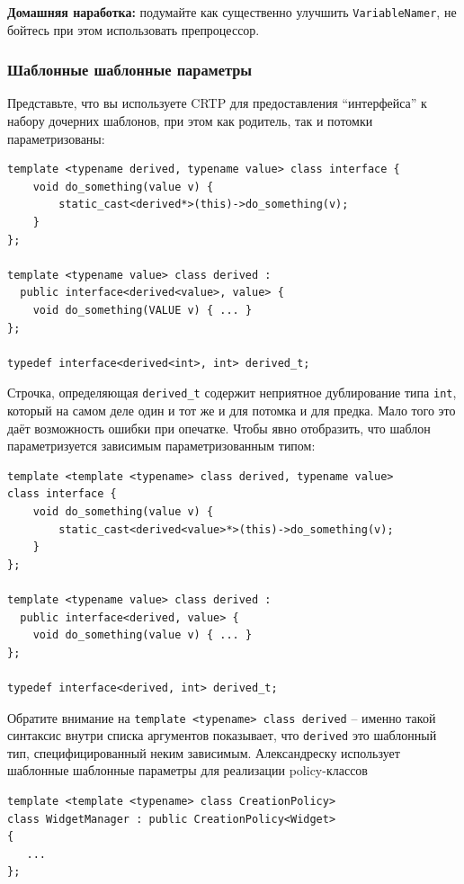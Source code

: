\documentclass[a4paper,12pt,oneside]{article}
\begin{document}
\textbf{Домашняя наработка:} подумайте как существенно улучшить \lstinline!VariableNamer!, не бойтесь при этом использовать препроцессор.

\subsubsection{Шаблонные шаблонные параметры}\label{TemplateTemplateArguments}

Представьте, что вы используете CRTP для предоставления ``интерфейса'' к набору дочерних шаблонов, при этом как родитель, так и потомки параметризованы:

\begin{lstlisting}
template <typename derived, typename value> class interface {
    void do_something(value v) {
        static_cast<derived*>(this)->do_something(v);
    }
};

template <typename value> class derived : 
  public interface<derived<value>, value> {
    void do_something(VALUE v) { ... }
};

typedef interface<derived<int>, int> derived_t;
\end{lstlisting}

Строчка, определяющая \lstinline!derived_t! содержит неприятное дублирование типа  \lstinline!int!, который на самом деле один и тот же и для потомка и для предка. Мало того это даёт возможность ошибки при опечатке. Чтобы явно отобразить, что шаблон параметризуется зависимым параметризованным типом:

\begin{lstlisting}
template <template <typename> class derived, typename value> 
class interface {
    void do_something(value v) {
        static_cast<derived<value>*>(this)->do_something(v);
    }
};

template <typename value> class derived : 
  public interface<derived, value> {
    void do_something(value v) { ... }
};

typedef interface<derived, int> derived_t;
\end{lstlisting}

Обратите внимание на \lstinline!template <typename> class derived! -- именно такой синтаксис внутри списка аргументов показывает, что \lstinline!derived! это шаблонный тип, специфицированный неким зависимым. Александреску\cite{mcpp} использует шаблонные шаблонные параметры для реализации policy-классов

\begin{lstlisting}
template <template <typename> class CreationPolicy>
class WidgetManager : public CreationPolicy<Widget>
{
   ...
};
\end{lstlisting}
\end{document}
